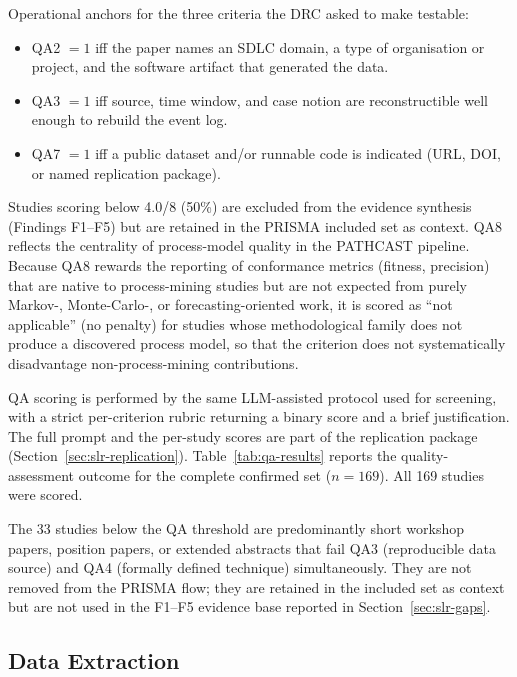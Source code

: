 Operational anchors for the three criteria the DRC asked to make testable:

\begin{itemize}
\item QA2 $= 1$ iff the paper names an SDLC domain, a type of
  organisation or project, and the software artifact that generated the
  data.
\item QA3 $= 1$ iff source, time window, and case notion are reconstructible
  well enough to rebuild the event log.
\item QA7 $= 1$ iff a public dataset and/or runnable code is indicated
  (URL, DOI, or named replication package).
\end{itemize}

Studies scoring below 4.0/8 (50\%) are excluded from the evidence synthesis
(Findings F1--F5) but are retained in the PRISMA included set as context.
QA8 reflects the centrality of process-model quality in the PATHCAST
pipeline. Because QA8 rewards the reporting of conformance metrics
(fitness, precision) that are native to process-mining studies but are not
expected from purely Markov-, Monte-Carlo-, or forecasting-oriented work,
it is scored as ``not applicable'' (no penalty) for studies whose
methodological family does not produce a discovered process model, so that
the criterion does not systematically disadvantage non-process-mining
contributions.

QA scoring is performed by the same LLM-assisted protocol used for
screening, with a strict per-criterion rubric returning a binary score
and a brief justification. The full prompt and the per-study scores are
part of the replication package (Section~\ref{sec:slr-replication}).
Table~\ref{tab:qa-results} reports the quality-assessment outcome for the
complete confirmed set ($n = 169$). All 169 studies were scored.



The 33 studies below the QA threshold are predominantly short workshop papers,
position papers, or extended abstracts that fail QA3 (reproducible data
source) and QA4 (formally defined technique) simultaneously. They are not
removed from the PRISMA flow; they are retained in the included set as
context but are not used in the F1--F5 evidence base reported in
Section~\ref{sec:slr-gaps}.


\subsection{Data Extraction}
\label{sec:slr-extraction}

